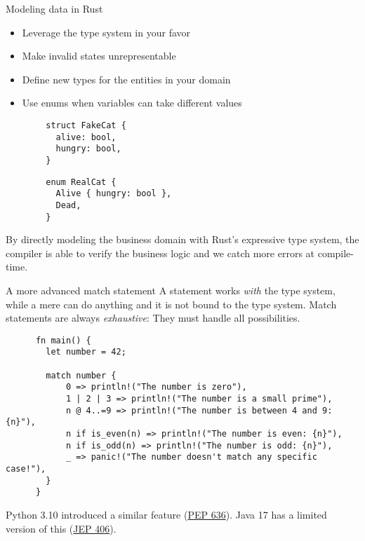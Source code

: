 \documentclass{beamer}
\begin{document}
\begin{frame}[fragile]{Modeling data in Rust}
  \begin{itemize}
    \item Leverage the type system in your favor
    \item Make invalid states unrepresentable
    \item Define new types for the entities in your domain
    \item Use enums when variables can take different values
  \end{itemize}

  \begin{multicols}{2}
    \begin{listing}
      \begin{verbatim}
        struct FakeCat {
          alive: bool,
          hungry: bool,
        }
      \end{verbatim}
    \end{listing}

    \begin{listing}
      \begin{verbatim}
        enum RealCat {
          Alive { hungry: bool },
          Dead,
        }
      \end{verbatim}
    \end{listing}
  \end{multicols}
  
  By directly modeling the business domain with Rust's expressive type system,
  the compiler is able to verify the business logic and
  we catch more errors at compile-time.
\end{frame}

\begin{frame}[fragile]{A more advanced match statement}
  A  statement works \emph{with} the type system,
  while a mere  can do anything and it is not bound to the type system.
  Match statements are always \emph{exhaustive}: They must handle all possibilities.

  \begin{listing}
    \begin{verbatim}
      fn main() {
        let number = 42;
    
        match number {
            0 => println!("The number is zero"),
            1 | 2 | 3 => println!("The number is a small prime"),
            n @ 4..=9 => println!("The number is between 4 and 9: {n}"),
            n if is_even(n) => println!("The number is even: {n}"),
            n if is_odd(n) => println!("The number is odd: {n}"),
            _ => panic!("The number doesn't match any specific case!"),
        }
      }
    \end{verbatim}
  \end{listing}

  Python 3.10 introduced a similar feature (\href{https://peps.python.org/pep-0636/}{PEP 636}).
  Java 17 has a limited version of this (\href{https://openjdk.org/jeps/406}{JEP 406}).
\end{frame}
\end{document}
